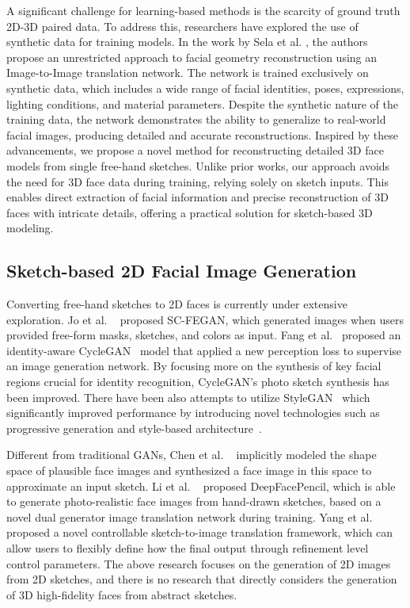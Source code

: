 A significant challenge for learning-based methods is the scarcity of ground truth 2D-3D paired data. To address this, researchers have explored the use of synthetic data for training models. In the work by Sela et al. \cite{sela2017unrestricted}, the authors propose an unrestricted approach to facial geometry reconstruction using an Image-to-Image translation network. The network is trained exclusively on synthetic data, which includes a wide range of facial identities, poses, expressions, lighting conditions, and material parameters. Despite the synthetic nature of the training data, the network demonstrates the ability to generalize to real-world facial images, producing detailed and accurate reconstructions. Inspired by these advancements, we propose a novel method for reconstructing detailed 3D face models from single free-hand sketches. Unlike prior works, our approach avoids the need for 3D face data during training, relying solely on sketch inputs. This enables direct extraction of facial information and precise reconstruction of 3D faces with intricate details, offering a practical solution for sketch-based 3D modeling.
\subsection{Sketch-based 2D Facial Image Generation} 
Converting free-hand sketches to 2D faces is currently under extensive exploration. Jo et al. ~\cite{Alpher10} proposed SC-FEGAN, which generated images when users provided free-form masks, sketches, and colors as input. Fang et al. ~\cite{Alpher11}proposed an identity-aware CycleGAN~\cite{zhu2017unpaired} model that applied a new perception loss to supervise an image generation network.
By focusing more on the synthesis of key facial regions crucial for identity recognition, CycleGAN's photo sketch synthesis has been improved. There have been also attempts to utilize StyleGAN~\cite{karras2019style} which significantly improved performance by introducing novel technologies such as progressive generation and style-based architecture~\cite{Alpher14}. 

Different from traditional GANs, Chen et al. ~\cite{Alpher15} implicitly modeled the shape space of plausible face images and synthesized a face image in this space to approximate an input sketch. Li et al. ~\cite{Alpher16} proposed DeepFacePencil, which is able to generate photo-realistic face images from hand-drawn sketches, based on a novel dual generator image translation network during training. Yang et al. ~\cite{Alpher18} proposed a novel controllable sketch-to-image translation framework, which can allow users to flexibly define how the final output through refinement level control parameters. The above research focuses on the generation of 2D images from 2D sketches, and there is no research that directly considers the generation of 3D high-fidelity faces from abstract sketches.

